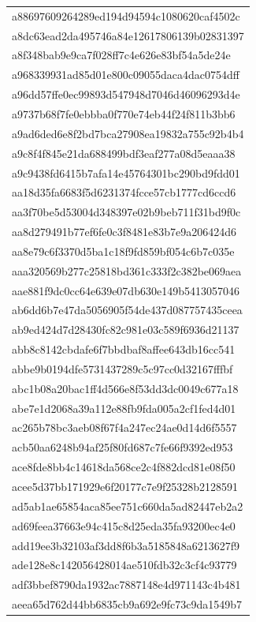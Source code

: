 \begin{tabular}{l}
a88697609264289ed194d94594c1080620caf4502c \\
a8dc63ead2da495746a84e12617806139b02831397 \\
a8f348bab9e9ca7f028ff7c4e626e83bf54a5de24e \\
a968339931ad85d01e800c09055daca4dac0754dff \\
a96dd57ffe0ec99893d547948d7046d46096293d4e \\
a9737b68f7fe0ebbba0f770e74eb44f24f811b3bb6 \\
a9ad6ded6e8f2bd7bca27908ea19832a755c92b4b4 \\
a9c8f4f845e21da688499bdf3eaf277a08d5eaaa38 \\
a9c9438fd6415b7afa14e45764301bc290bd9fdd01 \\
aa18d35fa6683f5d6231374fcce57cb1777cd6ccd6 \\
aa3f70be5d53004d348397e02b9beb711f31bd9f0c \\
aa8d279491b77ef6fe0c3f8481e83b7e9a206424d6 \\
aa8e79c6f3370d5ba1c18f9fd859bf054c6b7c035e \\
aaa320569b277c25818bd361c333f2c382be069aea \\
aae881f9dc0cc64e639e07db630e149b5413057046 \\
ab6dd6b7e47da5056905f54de437d087757435ceea \\
ab9ed424d7d28430fc82c981e03c589f6936d21137 \\
abb8c8142cbdafe6f7bbdbaf8affee643db16cc541 \\
abbe9b0194dfe5731437289c5c97cc0d32167fffbf \\
abc1b08a20bac1ff4d566e8f53dd3dc0049c677a18 \\
abe7e1d2068a39a112e88fb9fda005a2cf1fed4d01 \\
ac265b78bc3aeb08f67f4a247ec24ae0d14d6f5557 \\
acb50aa6248b94af25f80fd687c7fe66f9392ed953 \\
ace8fde8bb4c14618da568ce2c4f882dcd81e08f50 \\
acee5d37bb171929e6f20177c7e9f25328b2128591 \\
ad5ab1ae65854aca85ee751c660da5ad82447eb2a2 \\
ad69feea37663e94c415c8d25eda35fa93200ec4e0 \\
add19ee3b32103af3dd8f6b3a5185848a6213627f9 \\
ade128e8c142056428014ae510fdb32c3cf4c93779 \\
adf3bbef8790da1932ac7887148e4d971143c4b481 \\
aeea65d762d44bb6835cb9a692e9fc73c9da1549b7 \\

\end{tabular}
